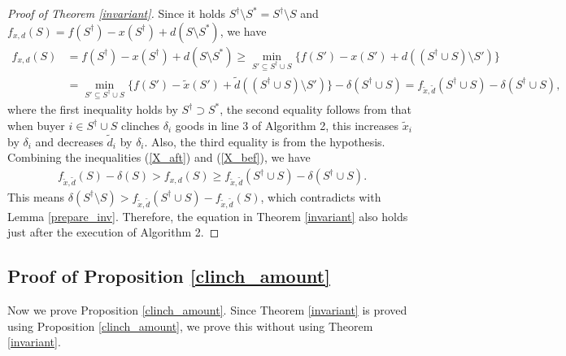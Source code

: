 \documentclass[letterpaper,11pt]{article}
\begin{document}
\begin{proof}[Proof of Theorem \ref{invariant}]
	Since it holds $S^{\dag}\setminus S^*=S^{\dag}\setminus S$ 
	and $f_{x,d}(S)=f(S^\dag)-x(S^\dag)+d(S\setminus S^*)$, we have 
	\begin{align}
	\label{X_bef}
	f_{x,d}(S)&=f(S^\dag)-x(S^\dag)+d(S\setminus S^*) 
	\geq \min_{S'\subseteq S^\dag\cup S}\{f(S')-x(S')+d((S^\dag\cup S)\setminus S')\} \nonumber\\ 
	&= \min_{S'\subseteq S^\dag\cup S}\{f(S')-\tilde{x}(S')+\tilde{d}((S^\dag\cup S)\setminus S')\}-\delta(S^\dag\cup S) 
	=f_{\tilde{x},\tilde{d}}(S^\dag\cup S)-\delta(S^\dag\cup S),
	\end{align}
	where the first inequality holds by $S^{\dag} \supset S^*$, 
	the second equality follows from that when buyer $i\in S^\dag\cup S$ clinches $\delta_i$ goods 
	in line 3 of Algorithm 2, 
	this increases $\tilde{x}_i$ by $\delta_i$ and decreases $\tilde{d}_i$ by $\delta_i$.
	Also, the third equality is from the hypothesis.
	Combining the inequalities (\ref{X_aft}) and (\ref{X_bef}), we have
	\begin{eqnarray*}
	f_{\tilde{x},\tilde{d}}(S)-\delta(S)>f_{x,d}(S)\geq f_{\tilde{x},\tilde{d}}(S^\dag\cup S)-\delta(S^\dag\cup S).
	\end{eqnarray*}
	This means $\delta(S^\dag\setminus S)>f_{\tilde{x},\tilde{d}}(S^\dag\cup S)-f_{\tilde{x},\tilde{d}}(S)$, 
	which contradicts with Lemma \ref{prepare_inv}.
	Therefore, the equation in Theorem \ref{invariant} also holds just after the execution of Algorithm 2.
	
	\end{proof}


\subsection{Proof of Proposition \ref{clinch_amount}}
	Now we prove Proposition \ref{clinch_amount}. 
	Since Theorem \ref{invariant} is proved using Proposition \ref{clinch_amount}, 
	we prove this without using Theorem \ref{invariant}.
	
\end{document}
